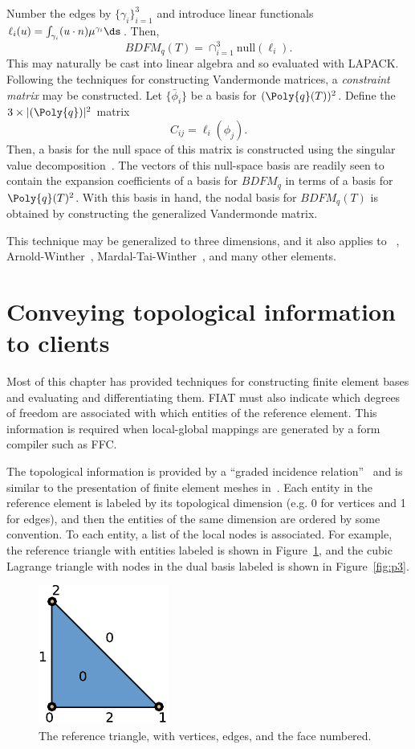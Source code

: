 Number the edges by \( \{ \gamma_i \}_{i=1}^3 \) and introduce linear
functionals \( \ell_i(u) = \int_{\gamma_i} (u \cdot n) \mu^{\gamma_i}
\ds \).  Then,
\[
BDFM_q(T) = \cap_{i=1}^3 \mathrm{null}(\ell_i).
\]
This may naturally be cast into linear algebra and so evaluated with
LAPACK.  Following the techniques for constructing Vandermonde matrices,
a \emph{constraint matrix} may be constructed.  Let \( \{ \bar{\phi}_i \}
\) be a basis for \( (\Poly{q}(T))^2 \).  Define the \( 3 \times |(\Poly{q})|^2
\) matrix
\[
C_{ij} = \ell_i( \phi_j ).
\]
Then, a basis for the null space of this matrix is constructed using
the singular value decomposition~\citep{GolubVan1996}.  The vectors of this
null-space basis are readily seen to contain the expansion coefficients
of a basis for \( BDFM_q \) in terms of a basis for \( \Poly{q}(T)^2 \).
With this basis in hand, the nodal basis for \( BDFM_q(T) \) is obtained
by constructing the generalized Vandermonde matrix.

This technique may be generalized to three dimensions,
and it also applies to \nedelec{}~\citep{Nedelec1980},
Arnold-Winther~\citep{ArnoldWinther2002},
Mardal-Tai-Winther~\citep{MardalTaiWinther2002}, and many other elements.

\section{Conveying topological information to clients}

Most of this chapter has provided techniques for constructing finite
element bases and evaluating and differentiating them.  FIAT must also
indicate which degrees of freedom are associated with which entities of
the reference element.  This information is required when local-global
mappings are generated by a form compiler such as FFC.

The topological information is provided by a ``graded incidence
relation''~\citep{Kirby2006a,KnepleyKarpeev2009} and is similar to the
presentation of finite element meshes in~\citet{Logg2009}.  Each entity in
the reference element is labeled by its topological dimension (e.g. 0 for
vertices and 1 for edges), and then the entities of the same dimension
are ordered by some convention.  To each entity, a list of the local nodes
is associated.  For example, the reference triangle with entities labeled
is shown in Figure~\ref{fig:reftri}, and the cubic Lagrange triangle
with nodes in the dual basis labeled is shown in Figure~\ref{fig:p3}.

\begin{figure}
  \centering
  \includegraphics[width=\smallfig]{chapters/kirby-2/pdf/reftri.pdf}
  \caption{The reference triangle, with vertices, edges, and the
    face numbered.}
  \label{fig:reftri}
\end{figure}

